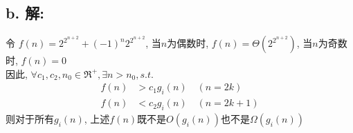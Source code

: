 \documentclass[12pt]{article}
\begin{document}
  \subsection*{b. \textbf{解:}}
    令 $ f(n)=2^{2^{n+2}}+(-1)^n2^{2^{n+2}} $, 当$n$为偶数时, $ f(n)=\Theta(2^{2^{n+2}}) $, 当$n$为奇数时, $ f(n)=0 $\\
    因此, $ \forall c_1, c_2, n_0 \in \Re^+, \exists n>n_0, s.t. $
    \begin{align}
      f(n) &> c_1g_i(n) \quad (n=2k)\\
      f(n) &< c_2g_i(n) \quad (n=2k+1)
    \end{align}
    则对于所有$g_i(n)$, 上述$f(n)$既不是$ O(g_i(n)) $也不是$ \Omega(g_i(n)) $
\end{document}
